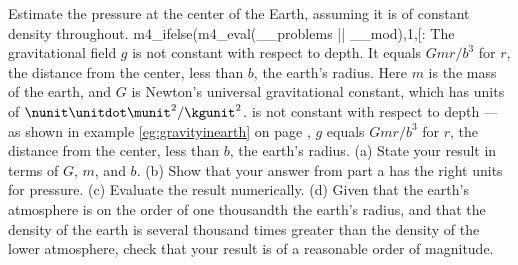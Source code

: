 Estimate the pressure at the center of the Earth,
assuming it is of constant density throughout. 
m4_ifelse(m4_eval(__problems || __mod),1,[:%
The gravitational field $g$ is not constant with respect to
depth. It equals $Gmr/b^3$ for $r$, the distance from the center,
less than $b$, the earth's radius. Here $m$ is the mass of the earth, and
$G$ is Newton's universal gravitational constant, which has units
of $\nunit\unitdot\munit^2/\kgunit^2$.%
is not constant with respect to depth --- as shown in
example \ref{eg:gravityinearth} on page \pageref{eg:gravityinearth},
$g$ equals $Gmr/b^3$ for $r$, the distance from the center,
less than $b$, the earth's radius.%
\hwendpart
(a) State your result in terms of $G$, $m$, and $b$.\answercheck\hwendpart
(b) Show that your answer from part a has the right units for pressure.\hwendpart
(c) Evaluate the result numerically. \answercheck \hwendpart
(d) Given that the earth's atmosphere is on the order of
 one thousandth the earth's radius, and that the density
of the earth is several thousand times greater than the density of the
lower atmosphere, check that your result is of a reasonable order of
magnitude.
